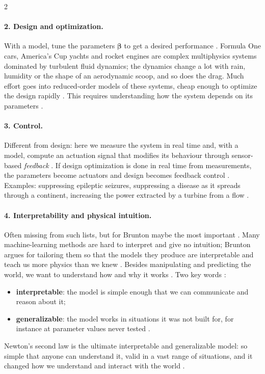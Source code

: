 \begin{paracol}{2}
\paragraph{2. Design and optimization.} With a model, tune the parameters $\boldsymbol\beta$ to get
a desired performance . Formula One cars, America's Cup yachts and
rocket engines are complex multiphysics systems dominated by turbulent fluid dynamics; the dynamics
change a lot with rain, humidity or the shape of an aerodynamic scoop, and so does the drag. Much
effort goes into reduced-order models of these systems, cheap enough to optimize the design rapidly
. This requires understanding how the system depends on its parameters
.

\paragraph{3. Control.} Different from design: here we measure the system in real time and, with a
model, compute an actuation signal that modifies its behaviour through sensor-based
\emph{feedback} . If design optimization is done in real time from measurements,
the parameters become actuators and design becomes feedback control . Examples:
suppressing epileptic seizures, suppressing a disease as it spreads through a continent, increasing the
power extracted by a turbine from a flow .

\paragraph{4. Interpretability and physical intuition.} Often missing from such lists, but for
Brunton maybe the most important . Many machine-learning methods are hard to interpret
and give no intuition; Brunton argues for tailoring them so that the models they produce are
interpretable and teach us more physics than we knew . Besides manipulating and
predicting the world, we want to understand how and why it works . Two key words
:
\begin{itemize}
  \item \textbf{interpretable}: the model is simple enough that we can communicate and reason about it;
  \item \textbf{generalizable}: the model works in situations it was not built for, for instance at
        parameter values never tested .
\end{itemize}
Newton's second law is the ultimate interpretable and generalizable model: so simple that anyone can
understand it, valid in a vast range of situations, and it changed how we understand and interact with
the world .


\end{paracol}
